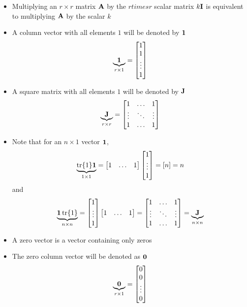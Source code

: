 \begin{itemize}
\item Multiplying an $r \times r$ matrix $\mathbf{A}$ by the $r times r$ scalar matrix $k\mathbf{I}$ is equivalent to multiplying $\mathbf{A}$ by the scalar $k$
\item A column vector with all elements $1$ will be denoted by $\mathbf{1}$ $$ \underbrace{\mathbf{1}}_{r \times 1} = \begin{bmatrix} 1 \\ 1 \\ \vdots \\ 1  \end{bmatrix} $$ 
\item A square matrix with all elements $1$ will be denoted by $\mathbf{J}$ $$ \underbrace{\mathbf{J}}_{r \times r} = \begin{bmatrix} 1 & \hdots & 1 \\ \vdots & \ddots & \vdots \\ 1 & \hdots & 1 \end{bmatrix} $$ 
\item Note that for an $n \times 1$ vector $\mathbf{1}$, $$ \underbrace{\tr{1}\mathbf{1}}_{1 \times 1} = \begin{bmatrix} 1 & \hdots & 1 \end{bmatrix}\begin{bmatrix} 1 \\ \vdots \\ 1 \end{bmatrix} = [n] = n $$ and $$ \underbrace{\mathbf{1}\tr{1}}_{n \times n} = \begin{bmatrix} 1 \\ \vdots \\ 1 \end{bmatrix} \begin{bmatrix} 1 & \hdots & 1 \end{bmatrix} = \begin{bmatrix} 1 & \hdots & 1 \\ \vdots & \ddots & \vdots \\ 1 & \hdots & 1  \end{bmatrix} = \underbrace{\mathbf{J}}_{n \times n} $$ 
\item A zero vector is a vector containing only zeros
\item The zero column vector will be denoted as $\mathbf{0}$ $$ \underbrace{\mathbf{0}}_{r \times 1} = \begin{bmatrix} 0 \\ 0 \\ \vdots \\ 0 \end{bmatrix} $$ 
\end{itemize}

